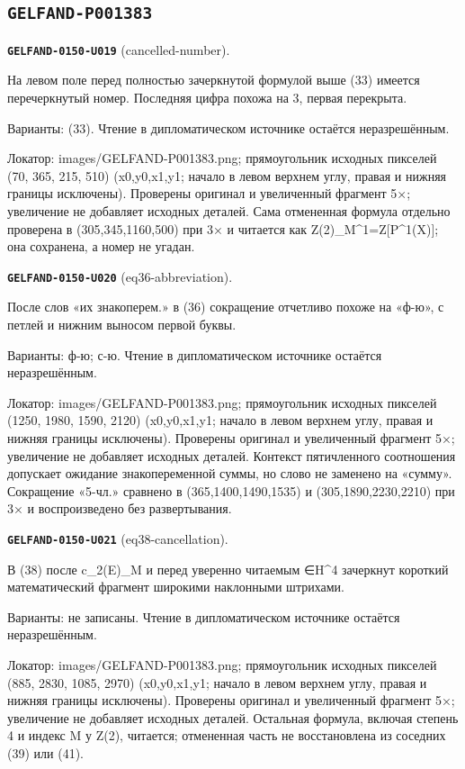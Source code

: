 \documentclass[11pt]{article}
\theoremstyle{definition}
\theoremstyle{remark}
\begin{document}
\subsection*{\texttt{GELFAND-P001383}}
\noindent\leavevmode{}\label{GELFAND-P001383:cancelled-number:note}\textbf{\texttt{GELFAND-0150-U019}} (cancelled-number).\par\nopagebreak[4]
На левом поле перед полностью зачеркнутой формулой выше (33) имеется перечеркнутый номер. Последняя цифра похожа на 3, первая перекрыта.\par
Варианты: (33). Чтение в дипломатическом источнике остаётся неразрешённым.\par
Локатор: images/GELFAND-P001383.png; прямоугольник исходных пикселей (70, 365, 215, 510) (x0,y0,x1,y1; начало в левом верхнем углу, правая и нижняя границы исключены). Проверены оригинал и увеличенный фрагмент 5×; увеличение не добавляет исходных деталей. Сама отмененная формула отдельно проверена в (305,345,1160,500) при 3× и читается как Z(2)\_M\textasciicircum{}1=Z[P\textasciicircum{}1(X)]; она сохранена, а номер не угадан.\par\medskip
\noindent\leavevmode{}\label{GELFAND-P001383:eq36-abbreviation:note}\textbf{\texttt{GELFAND-0150-U020}} (eq36-abbreviation).\par\nopagebreak[4]
После слов «их знакоперем.» в (36) сокращение отчетливо похоже на «ф-ю», с петлей и нижним выносом первой буквы.\par
Варианты: ф-ю; с-ю. Чтение в дипломатическом источнике остаётся неразрешённым.\par
Локатор: images/GELFAND-P001383.png; прямоугольник исходных пикселей (1250, 1980, 1590, 2120) (x0,y0,x1,y1; начало в левом верхнем углу, правая и нижняя границы исключены). Проверены оригинал и увеличенный фрагмент 5×; увеличение не добавляет исходных деталей. Контекст пятичленного соотношения допускает ожидание знакопеременной суммы, но слово не заменено на «сумму». Сокращение «5-чл.» сравнено в (365,1400,1490,1535) и (305,1890,2230,2210) при 3× и воспроизведено без развертывания.\par\medskip
\noindent\leavevmode{}\label{GELFAND-P001383:eq38-cancellation:note}\textbf{\texttt{GELFAND-0150-U021}} (eq38-cancellation).\par\nopagebreak[4]
В (38) после c\_2(E)\_M и перед уверенно читаемым ∈H\textasciicircum{}4 зачеркнут короткий математический фрагмент широкими наклонными штрихами.\par
Варианты: не записаны. Чтение в дипломатическом источнике остаётся неразрешённым.\par
Локатор: images/GELFAND-P001383.png; прямоугольник исходных пикселей (885, 2830, 1085, 2970) (x0,y0,x1,y1; начало в левом верхнем углу, правая и нижняя границы исключены). Проверены оригинал и увеличенный фрагмент 5×; увеличение не добавляет исходных деталей. Остальная формула, включая степень 4 и индекс M у Z(2), читается; отмененная часть не восстановлена из соседних (39) или (41).\par\medskip
\end{document}
